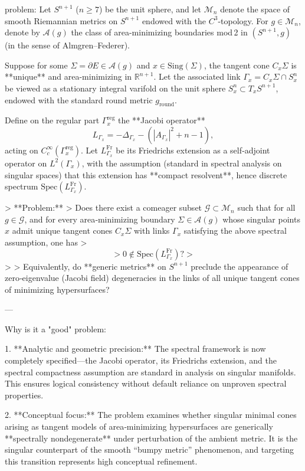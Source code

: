 problem:  
Let \(S^{n+1}\) (\(n \ge 7\)) be the unit sphere, and let \(\mathcal{M}_n\) denote the space of smooth Riemannian metrics on \(S^{n+1}\) endowed with the \(C^3\)-topology.  
For \(g \in \mathcal{M}_n\), denote by \(\mathcal{A}(g)\) the class of area-minimizing boundaries mod 2 in \((S^{n+1}, g)\) (in the sense of Almgren–Federer).  

Suppose for some \(\Sigma = \partial E \in \mathcal{A}(g)\) and \(x \in \mathrm{Sing}(\Sigma)\), the tangent cone \(C_x\Sigma\) is **unique** and area-minimizing in \(\mathbb{R}^{n+1}\).  
Let the associated link \(\Gamma_x = C_x\Sigma \cap S_x^n\) be viewed as a stationary integral varifold on the unit sphere \(S_x^n \subset T_xS^{n+1}\), endowed with the standard round metric \(g_{\mathrm{round}}\).  

Define on the regular part \(\Gamma_x^{\mathrm{reg}}\) the **Jacobi operator**  
\[
L_{\Gamma_x} = -\Delta_{\Gamma_x} - (|A_{\Gamma_x}|^2 + n-1),
\]
acting on \(C_c^\infty(\Gamma_x^{\mathrm{reg}})\).  
Let \(L_{\Gamma_x}^{\mathrm{Fr}}\) be its Friedrichs extension as a self‑adjoint operator on \(L^2(\Gamma_x)\), with the assumption (standard in spectral analysis on singular spaces) that this extension has **compact resolvent**, hence discrete spectrum \(\mathrm{Spec}(L_{\Gamma_x}^{\mathrm{Fr}})\).

> **Problem:**  
> Does there exist a comeager subset \(\mathcal{G} \subset \mathcal{M}_n\) such that for all \(g \in \mathcal{G}\), and for every area‑minimizing boundary \(\Sigma \in \mathcal{A}(g)\) whose singular points \(x\) admit unique tangent cones \(C_x\Sigma\) with links \(\Gamma_x\) satisfying the above spectral assumption, one has
> \[
> 0 \notin \mathrm{Spec}(L_{\Gamma_x}^{\mathrm{Fr}})?
> \]
>  
> Equivalently, do **generic metrics** on \(S^{n+1}\) preclude the appearance of zero‑eigenvalue (Jacobi field) degeneracies in the links of all unique tangent cones of minimizing hypersurfaces?

---

Why is it a "good" problem:  

1. **Analytic and geometric precision:**  
   The spectral framework is now completely specified—the Jacobi operator, its Friedrichs extension, and the spectral compactness assumption are standard in analysis on singular manifolds. This ensures logical consistency without default reliance on unproven spectral properties.

2. **Conceptual focus:**  
   The problem examines whether singular minimal cones arising as tangent models of area‑minimizing hypersurfaces are generically **spectrally nondegenerate** under perturbation of the ambient metric. It is the singular counterpart of the smooth “bumpy metric” phenomenon, and targeting this transition represents high conceptual refinement.

